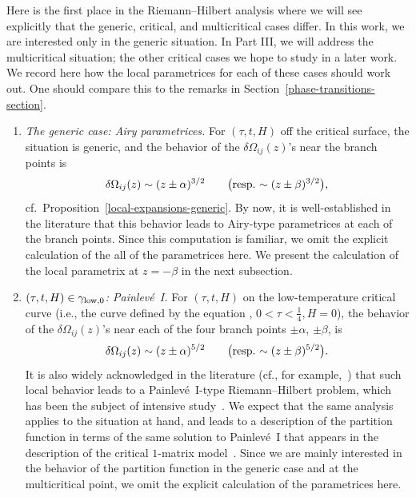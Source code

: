 \documentclass[pdftex]{sigma}
\numberwithin{equation}{section}
\begin{document}
\begin{Remark} %
Here is the first place in the Riemann--Hilbert analysis where we will see explicitly that the generic, critical, and multicritical cases differ. In this work, we are interested only in the generic situation. In Part III, we will address the multicritical situation; the other critical cases we hope to study in a later work. We record here how the local parametrices for each of these cases should work out. One should compare this to the remarks in Section~\ref{phase-transitions-section}.
 \begin{enumerate}\itemsep=0pt
 \item[$(1)$] \textit{The generic case: Airy parametrices.}
 For $(\tau,t,H)$ off the critical surface, the situation is generic, and the behavior of the $\delta\Omega_{ij}(z)$'s near the branch points is
 \begin{equation*}
 \delta\Omega_{ij}(z) \sim (z\pm \alpha)^{3/2} \qquad \text{\big(resp.\ $\sim (z\pm \beta)^{3/2}$\big)},
 \end{equation*}
 cf.\ Proposition~\ref{local-expansions-generic}. By now, it is well-established in the literature that this behavior leads to Airy-type parametrices at each of the branch points. Since this computation is familiar, we omit the explicit calculation of the all of the parametrices here. We present the calculation of the local parametrix at $z=-\beta$ in the next subsection.


 \item[$(2)$] \textit{$(\tau,t,H)\in \gamma_{{\rm low},0}$: Painlev\'{e}~I.}
 For $(\tau,t,H)$ on the low-temperature critical curve (i.e., the curve defined by the equation , $0<\tau<\frac{1}{4}, H=0$),
 the behavior of the $\delta \Omega_{ij}(z)$'s near each of the four branch points $\pm \alpha$, $\pm \beta$, is
 \begin{equation*}
 \delta \Omega_{ij}(z) \sim (z\pm \alpha)^{5/2} \qquad \text{\big(resp.\ $\sim (z\pm \beta)^{5/2}$\big)}.
 \end{equation*}
 It is also widely acknowledged in the literature (cf., for example,~\cite{DK0}) that such local behavior leads to a Painlev\'{e}~I-type Riemann--Hilbert
 problem, which has been the subject of intensive study~\cite{Kapaev,Kapaev-Kitaev}. We expect that the same analysis applies to the situation at hand,
 and leads to a description of the partition function in terms of the same solution to Painlev\'{e}~I that appears in the description of the critical
 $1$-matrix model~\cite{DK0, FIK1,FIK2}. Since we are mainly interested in the behavior of the partition function in the generic case and at the multicritical point, we omit the explicit calculation of the parametrices here.



\end{enumerate}
\end{Remark}
\end{document}
